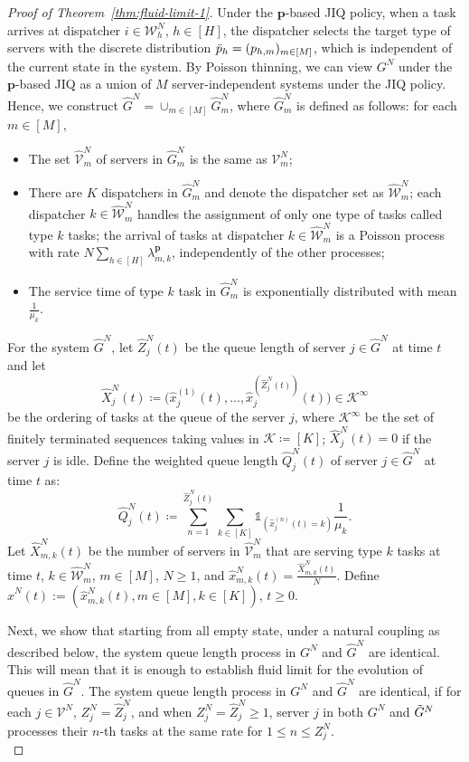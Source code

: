 \documentclass[11pt, reqno]{article}
\numberwithin{equation}{section}
\numberwithin{theorem}{section}
\begin{document}
\begin{proof}[Proof of Theorem~\ref{thm:fluid-limit-1}]
Under the $\mathbf{p}$-based JIQ policy, when a task arrives at dispatcher $i\in \mathcal{W}^N_h$, $h\in[H]$, the dispatcher selects the target type of servers with the discrete distribution $\Bar{p}_h=(p_{h,m})_{m\in[M]}$, which is independent of the current state in the system. 
By Poisson thinning, we can view $G^N$ under the $\mathbf{p}$-based JIQ as a union of $M$ server-independent systems under the JIQ policy. 
Hence, we construct $\hat{G}^N=\cup_{m\in[M]}\hat{G}^N_m$, where $\hat{G}^N_m$ is defined as follows:
for each $m\in[M]$, \begin{itemize}
    \item The set $\hat{\mathcal{V}}^N_m$ of servers in $\hat{G}^N_m$ is the same as $\mathcal{V}^N_m$;
    \item There are $K$ dispatchers in $\hat{G}^N_m$ and denote the dispatcher set as $\hat{\mathcal{W}}^N_m$; each dispatcher $k\in\hat{\mathcal{W}}^N_m$ handles the assignment of only one type of tasks called type $k$ tasks; the arrival of tasks at dispatcher $k\in\hat{\mathcal{W}}^N_m$ is a Poisson process with rate $N\sum_{h\in[H]}\lambda^{\mathbf{p}}_{m,k}$, independently of the other processes;
    \item The service time of type $k$ task in $\hat{G}^N_m$ is exponentially distributed with mean $\frac{1}{\mu_k}$.
\end{itemize}
For the system $\hat{G}^N$, let $\hat{Z}^N_j(t)$ be the queue length of server $j\in\hat{G}^N$ at time $t$ and let $$\hat{X}^N_j(t)\coloneqq\Big(\hat{x}^{(1)}_{j}(t),...,\hat{x}^{(\hat{Z}^N_j(t))}_{j}(t)\Big)\in\mathcal{K}^{\infty}$$ 
be the ordering of tasks at the queue of the server $j$, where $\mathcal{K}^{\infty}$ be the set of finitely terminated sequences taking values in $\mathcal{K}\coloneqq[K]$; $\hat{X}^N_j(t)=0$ if the server $j$ is idle. 
Define the weighted queue length $\hat{Q}^N_j(t)$ of server $j\in\hat{G}^N$ at time $t$ as:
$$\hat{Q}^N_j(t)\coloneqq\sum_{n=1}^{\hat{Z}^N_j(t)}\sum_{k\in[K]}\mathds{1}_{(\hat{x}^{(n)}_{j}(t)=k)}\frac{1}{\mu_k}.$$
Let $\hat{X}^N_{m,k}(t)$ be the number of servers in $\hat{\mathcal{V}}^N_m$ that are serving type $k$ tasks at time $t$, $k\in\hat{\mathcal{W}}^N_m$, $m\in [M]$, $N\geq 1$, and $\hat{x}^N_{m,k}(t)=\frac{\hat{X}^N_{m,k}(t)}{N}$. 
Define $\hat{x}^N(t):=(\hat{x}^N_{m,k}(t),m\in[M],k\in[K])$, $t\geq 0$.
\vspace{3mm}

\noindent
Next, we show that starting from all empty state, under a natural coupling as described below, the system queue length process in $G^N$ and $\hat{G}^N$ are identical.
This will mean that it is enough to establish fluid limit for the evolution of queues in  $\hat{G}^N$. 
The system queue length process in $G^N$ and $\hat{G}^N$ are identical, if for each $j\in\mathcal{V}^N$, $Z^N_j=\hat{Z}^N_j$, and when $Z^N_j=\hat{Z}^N_j \geq 1$, server $j$ in both $G^N$ and $\Tilde{G}^N$ processes their $n$-th tasks at the same rate %
for $1\leq n\leq Z^N_j$.
\\ 


\end{proof}
\end{document}
